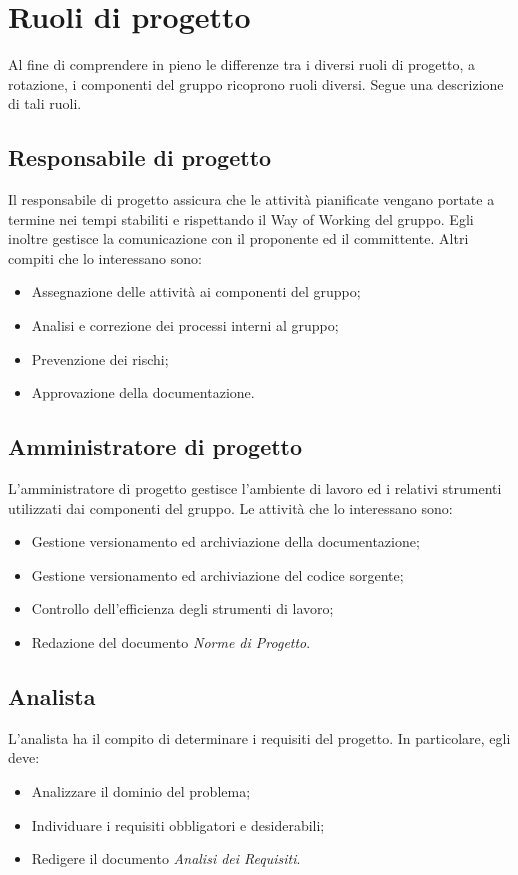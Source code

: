 \documentclass{article}
\begin{document}
\section{Ruoli di progetto}
Al fine di comprendere in pieno le differenze tra i diversi ruoli di progetto, a rotazione, i componenti del gruppo ricoprono ruoli diversi. Segue una descrizione di tali ruoli.

\subsection{Responsabile di progetto}
Il responsabile di progetto assicura che le attività pianificate vengano portate a termine nei tempi stabiliti e rispettando il Way of Working del gruppo. Egli inoltre gestisce la comunicazione con il proponente ed il committente. Altri compiti che lo interessano sono:
\begin{itemize}
    \item Assegnazione delle attività ai componenti del gruppo;
    \item Analisi e correzione dei processi interni al gruppo;
    \item Prevenzione dei rischi;
    \item Approvazione della documentazione.
\end{itemize}

\subsection{Amministratore di progetto}
L'amministratore di progetto gestisce l'ambiente di lavoro ed i relativi strumenti utilizzati dai componenti del gruppo. Le attività che lo interessano sono:
\begin{itemize}
    \item Gestione versionamento ed archiviazione della documentazione;
    \item Gestione versionamento ed archiviazione del codice sorgente;
    \item Controllo dell'efficienza degli strumenti di lavoro;
    \item Redazione del documento \textit{Norme di Progetto}.
\end{itemize}

\subsection{Analista}
L'analista ha il compito di determinare i requisiti del progetto. In particolare, egli deve:
\begin{itemize}
    \item Analizzare il dominio del problema;
    \item Individuare i requisiti obbligatori e desiderabili;
    \item Redigere il documento \textit{Analisi dei Requisiti}.
\end{itemize}
\end{document}
